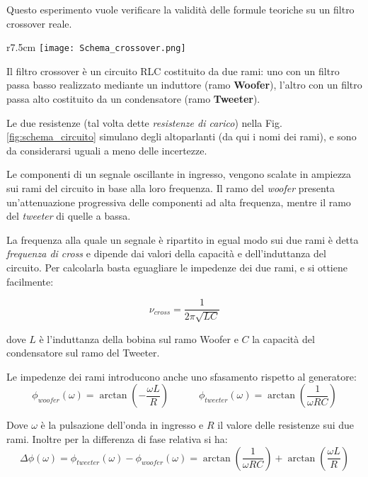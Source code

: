\documentclass[../Relazione_circuiti]{subfiles}
\begin{document}
Questo esperimento vuole verificare la validità delle formule teoriche su un filtro crossover reale.

\begin{wrapfigure}{r}{7.5cm}
  \centering
  \texttt{[image: Schema\_crossover.png]}
  \caption{Schema del circuito realizzato}
  \label{fig:schema_circuito}
\end{wrapfigure}

Il filtro crossover è un circuito RLC costituito da due rami: uno con un filtro passa basso realizzato mediante un
induttore (ramo \textbf{Woofer}), l'altro con un filtro passa alto costituito da un condensatore (ramo
\textbf{Tweeter}).

Le due resistenze (tal volta dette \textit{resistenze di carico}) nella Fig.\,\ref{fig:schema_circuito} simulano degli
altoparlanti (da qui i nomi dei rami), e sono da considerarsi uguali a meno delle incertezze.

Le componenti di un segnale oscillante in ingresso, vengono scalate in ampiezza sui rami del circuito in base alla loro
frequenza.
Il ramo del \textit{woofer} presenta un'attenuazione progressiva delle componenti ad alta frequenza, mentre il ramo
del \textit{tweeter} di quelle a bassa.

La frequenza alla quale un segnale è ripartito in egual modo sui due rami è detta \textit{frequenza di cross} e dipende
dai valori della capacità e dell'induttanza del circuito.
Per calcolarla basta eguagliare le impedenze dei due rami, e si ottiene facilmente:

\begin{equation}
  \label{eq:f_cross}
  \nu_{cross} = \frac{1}{2 \pi \sqrt{LC} }
\end{equation}

dove $L$ è l'induttanza della bobina sul ramo Woofer e $C$ la capacità del condensatore sul ramo del Tweeter.

Le impedenze dei rami introducono anche uno sfasamento rispetto al generatore:
\begin{equation*}
  \phi_{woofer}(\omega) = \arctan(-\frac{\omega L}{R}) \qquad \quad %
  \phi_{tweeter}(\omega) = \arctan(\frac{1}{\omega RC}) %
\end{equation*}

Dove $\omega$ è la pulsazione dell'onda in ingresso e $R$ il valore delle resistenze sui due rami.
Inoltre per la differenza di fase relativa si ha:
\begin{equation}
  \label{eq:p_diff}
  \Delta \phi(\omega) = \phi_{tweeter}(\omega) - \phi_{woofer}(\omega) = \arctan(\frac{1}{\omega RC}) + \arctan(\frac{\omega L}{R})
\end{equation}
\end{document}
